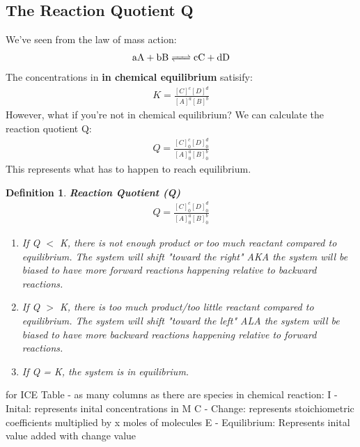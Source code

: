 \documentclass{article}  %
\newtheorem{defn}{Definition}
\begin{document}
\subsection*{The Reaction Quotient Q}
We've seen from the law of mass action: 
\begin{equation*}
    \begin{aligned}
        \ce{aA + bB <=> cC + dD}
    \end{aligned}
\end{equation*}
The concentrations in \textbf{in chemical equilibrium} satisify:
\begin{equation*}
    \begin{aligned}
        K = \frac{[C]^c[D]^d}{[A]^a[B]^b} 
    \end{aligned}
\end{equation*}
However, what if you're not in chemical equilibrium? We can calculate the reaction quotient Q:
\begin{equation*}
    \begin{aligned}
        Q = \frac{[C]^c_0[D]^d_0}{[A]^a_0[B]^b_0} 
    \end{aligned}
\end{equation*}
This represents what has to happen to reach equilibrium.

\begin{defn}
    \textbf{Reaction Quotient (Q)} 
    \begin{equation*}
        \begin{aligned}
            Q = \frac{[C]^c_0[D]^d_0}{[A]^a_0[B]^b_0} 
        \end{aligned}
    \end{equation*}
    \begin{enumerate}
        \item If Q $<$ K, there is not enough product or too much reactant compared to equilibrium. The system will shift "toward the right" AKA the system will be biased to have more forward reactions happening relative to backward reactions.
        \item If Q $>$ K, there is too much product/too little reactant compared to equilibrium. The system will shift "toward the left" ALA the system will be biased to have more backward reactions happening relative to forward reactions.
        \item If Q = K, the system is in equilibrium.
    \end{enumerate}
\end{defn}

for ICE Table - as many columns as there are species in chemical reaction:
I - Inital: represents inital concentrations in M
C - Change: represents stoichiometric coefficients multiplied by x moles of molecules
E - Equilibrium: Represents inital value added with change value 
\end{document}
